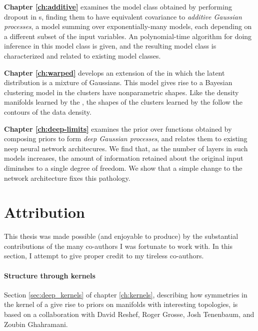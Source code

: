 {\bf Chapter \ref{ch:additive}} examines the model class obtained by performing dropout in \gp{}s, finding them to have equivalent covariance to \emph{additive Gaussian processes}, a model summing over exponentially-many \gp{} models, each depending on a different subset of the input variables.  An polynomial-time algorithm for doing inference in this model class is given, and the resulting model class is characterized and related to existing model classes.

{\bf Chapter \ref{ch:warped}} develops an extension of the \gplvm{} in which the latent distribution is a mixture of Gaussians.  This model gives rise to a Bayesian clustering model in the clusters have nonparametric shapes.  Like the density manifolds learned by the \gplvm{}, the shapes of the clusters learned by the \iwmm{} follow the contours of the data density.

{\bf Chapter \ref{ch:deep-limits}} examines the prior over functions obtained by composing \gp{} priors to form \emph{deep Gaussian processes}, and relates them to existing neep neural network architecures.
We find that, as the number of layers in such models increases, the amount of information retained about the original input diminshes to a single degree of freedom.
We show that a simple change to the network architecture fixes this pathology.


\section{Attribution}

This thesis was made possible (and enjoyable to produce) by the substantial contributions of the many co-authors I was fortunate to work with.
In this section, I %
attempt to give proper credit to my tireless co-authors.

\paragraph{Structure through kernels}
Section \ref{sec:deep_kernels} of chapter \ref{ch:kernels}, describing how symmetries in the kernel of a \gplvm{} give rise to priors on manifolds with interesting topologies, is based on a collaboration with David Reshef, Roger Grosse, Josh Tenenbaum, and Zoubin Ghahramani.

